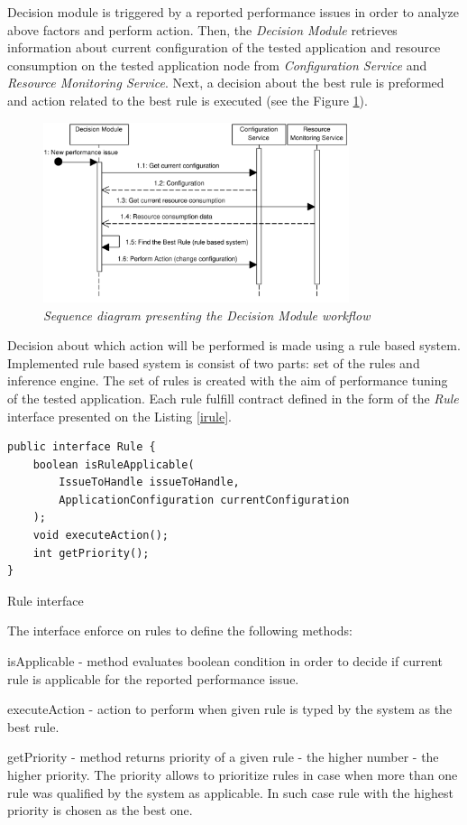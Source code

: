\documentclass[12pt,a4paper]{article}
\let\tempone\itemize
\let\temptwo\enditemize
\renewenvironment{itemize}{\tempone\addtolength{\itemsep}{-0.4\baselineskip}}{\temptwo}
\begin{document}
Decision module is triggered by a reported performance issues in order to analyze above factors and perform action. Then, the \textit{Decision Module} retrieves information about current configuration of the tested application and resource consumption on the tested application node from \textit{Configuration Service} and \textit{Resource Monitoring Service}. Next, a decision about the best rule is preformed and action related to the best rule is executed (see the Figure \ref{dmsequence}). 

\begin{figure}[!htb]
\centering
\includegraphics[width=0.8\textwidth]{DecisionModuleSequenceDiagram}
\caption{\textit{Sequence diagram presenting the Decision Module workflow}} \label{dmsequence}
\end{figure}

Decision about which action will be performed is made using a rule based system. Implemented rule based system is consist of two parts: set of the rules and inference engine. The set of rules is created with the aim of performance tuning of the tested application. Each rule fulfill contract defined in the form of the \textit{Rule} interface presented on the Listing \ref{irule}.

\begin{listing}[ht]\begin{verbatim}
public interface Rule {
    boolean isRuleApplicable(
    	IssueToHandle issueToHandle, 
    	ApplicationConfiguration currentConfiguration
    );
    void executeAction();
    int getPriority();
}
\end{verbatim}
\caption{Rule interface} \label{irule}
\end{listing}

The interface enforce on rules to define the following methods: 
\begin{itemize}
\item isApplicable - method evaluates boolean condition in order to decide if current rule is applicable for the reported performance issue.   
\item executeAction - action to perform when given rule is typed by the system as the best rule.   
\item getPriority - method returns priority of a given rule - the higher number - the higher priority. The priority allows to prioritize rules in case when more than one rule was qualified by the system as applicable. In such case rule with the highest priority is chosen as the best one. 
\end{itemize}
\end{document}
